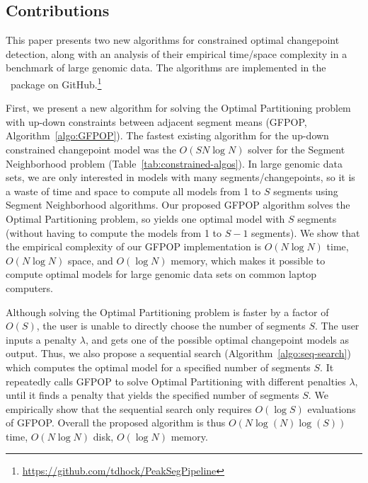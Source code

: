 \documentclass[article]{jss}
\newcommand{\R}{\proglang{R}}
\begin{document}


\subsection{Contributions}

This paper presents two new algorithms for constrained optimal
changepoint detection, along with an analysis of their empirical
time/space complexity in a benchmark of large genomic data. The
algorithms are implemented in the \R\ package
 on GitHub.\footnote{
\url{https://github.com/tdhock/PeakSegPipeline}
}

First, we present a new algorithm for solving the Optimal Partitioning
problem with up-down constraints between adjacent segment means
(GFPOP, Algorithm~\ref{algo:GFPOP}). The fastest existing algorithm
for the up-down constrained changepoint model was the
$O(SN\log N)$ solver for the Segment Neighborhood problem
(Table~\ref{tab:constrained-algos}). In large genomic data sets, we
are only interested in models with many segments/changepoints, so it
is a waste of time and space to compute all models from 1 to $S$
segments using Segment Neighborhood algorithms. Our proposed GFPOP
algorithm solves the Optimal Partitioning problem, so yields one
optimal model with $S$ segments (without having to compute the models
from 1 to $S-1$ segments). We show that the empirical complexity of
our GFPOP implementation is $O(N\log N)$ time, $O(N\log N)$ space, and
$O(\log N)$ memory, which makes it possible to compute optimal models
for large genomic data sets on common laptop computers.

Although solving the Optimal Partitioning problem is faster by a
factor of $O(S)$, the user is unable to directly choose the number of
segments $S$. The user inputs a penalty $\lambda$, and gets one of the
possible optimal changepoint models as output. Thus, we also propose a
sequential search (Algorithm~\ref{algo:seq-search}) which computes the
optimal model for a specified number of segments $S$. It repeatedly
calls GFPOP to solve Optimal Partitioning with different penalties
$\lambda$, until it finds a penalty that yields the specified number
of segments $S$. We empirically show that the sequential search only
requires $O(\log S)$ evaluations of GFPOP. Overall the proposed
algorithm is thus $O( N \log(N)\log(S))$ time, $O(N\log N)$ disk,
$O(\log N)$ memory. 
\end{document}
